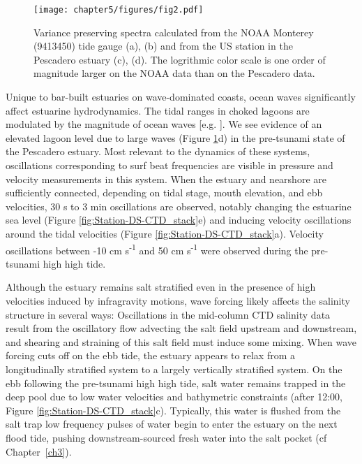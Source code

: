 

\begin{figure}
\textsf{\texttt{[image: chapter5/figures/fig2.pdf]}}

\protect\caption{Variance preserving spectra calculated from the NOAA Monterey (9413450)
tide gauge (a), (b) and from the US station in the Pescadero estuary
(c), (d).  The logrithmic color scale is one order of magnitude larger
on the NOAA data than on the Pescadero data.\label{fig:Pescadero-stacked-variance_presreving_spectra}}
\end{figure}

Unique to bar-built estuaries on wave-dominated coasts, ocean waves
significantly affect estuarine hydrodynamics. The tidal ranges in
choked lagoons are modulated by the magnitude of ocean waves {[}e.g.
\cite{malhadas_effect_2009}{]}. We see evidence of an elevated
lagoon level due to large waves (Figure \ref{fig:Pescadero-stacked-variance_presreving_spectra}d)
in the pre-tsunami state of the Pescadero estuary. Most relevant to
the dynamics of these systems, oscillations corresponding to surf
beat frequencies are visible in pressure and velocity measurements
in this system. When the estuary and nearshore are sufficiently connected,
depending on tidal stage, mouth elevation, and ebb velocities, 30
s to 3 min oscillations are observed, notably changing the estuarine
sea level (Figure \ref{fig:Station-DS-CTD_stack}e) and inducing velocity
oscillations around the tidal velocities (Figure \ref{fig:Station-DS-CTD_stack}a).
Velocity oscillations between -10 cm s\textsuperscript{-1} and 50
cm s\textsuperscript{-1} were observed during the pre-tsunami high
high tide. 

Although the estuary remains salt stratified even in the presence
of high velocities induced by infragravity motions, wave forcing likely
affects the salinity structure in several ways: Oscillations in the
mid-column CTD salinity data result from the oscillatory flow advecting
the salt field upstream and downstream, and shearing and straining
of this salt field must induce some mixing. When wave forcing cuts
off on the ebb tide, the estuary appears to relax from a longitudinally
stratified system to a largely vertically stratified system. On the
ebb following the pre-tsunami high high tide, salt water remains trapped
in the deep pool due to low water velocities and bathymetric constraints
(after 12:00, Figure \ref{fig:Station-DS-CTD_stack}c). Typically,
this water is flushed from the salt trap low frequency pulses of water
begin to enter the estuary on the next flood tide, pushing downstream-sourced
fresh water into the salt pocket (cf Chapter~\ref{ch3}). 


